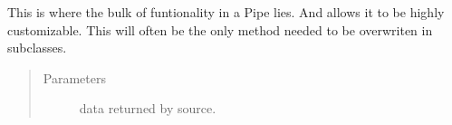 \documentclass[letterpaper,10pt,english]{sphinxmanual}
\begin{document}
\begin{fulllineitems}
\begin{fulllineitems}
This is where the bulk of funtionality in a Pipe lies. And allows it
to be highly customizable. This will often be the only method needed
to be overwriten in subclasses.
\begin{quote}\begin{description}
\item[{Parameters}] \leavevmode
{} \textendash{} data returned by source.

\end{description}\end{quote}

\end{fulllineitems}


\end{fulllineitems}

\end{document}
